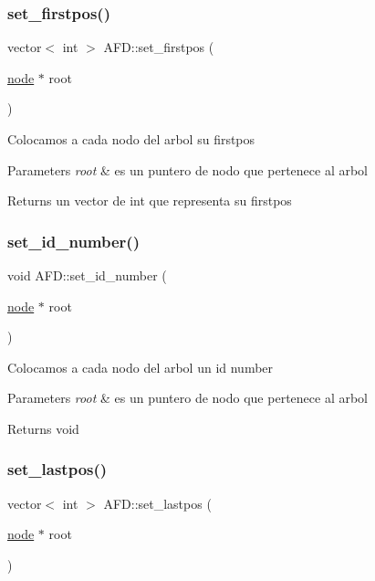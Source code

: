 \subsubsection{\texorpdfstring{set\+\_\+firstpos()}{set\_firstpos()}}
{\footnotesize\ttfamily vector$<$ int $>$ A\+F\+D\+::set\+\_\+firstpos (\begin{DoxyParamCaption}\item[{\hyperlink{structnode}{node} $\ast$}]{root }\end{DoxyParamCaption})}

Colocamos a cada nodo del arbol su firstpos 
\begin{DoxyParams}{Parameters}
{\em root} & es un puntero de nodo que pertenece al arbol \\
\hline
\end{DoxyParams}
\begin{DoxyReturn}{Returns}
un vector de int que representa su firstpos 
\end{DoxyReturn}
\hypertarget{class_a_f_d_a28ca2cf650830a32d1e1716f4a3c4e78}{}\label{class_a_f_d_a28ca2cf650830a32d1e1716f4a3c4e78} 
\subsubsection{\texorpdfstring{set\+\_\+id\+\_\+number()}{set\_id\_number()}}
{\footnotesize\ttfamily void A\+F\+D\+::set\+\_\+id\+\_\+number (\begin{DoxyParamCaption}\item[{\hyperlink{structnode}{node} $\ast$}]{root }\end{DoxyParamCaption})}

Colocamos a cada nodo del arbol un id number 
\begin{DoxyParams}{Parameters}
{\em root} & es un puntero de nodo que pertenece al arbol \\
\hline
\end{DoxyParams}
\begin{DoxyReturn}{Returns}
void 
\end{DoxyReturn}
\hypertarget{class_a_f_d_a6ebbbeb7971579ee7085730c52ee7dc5}{}\label{class_a_f_d_a6ebbbeb7971579ee7085730c52ee7dc5} 
\subsubsection{\texorpdfstring{set\+\_\+lastpos()}{set\_lastpos()}}
{\footnotesize\ttfamily vector$<$ int $>$ A\+F\+D\+::set\+\_\+lastpos (\begin{DoxyParamCaption}\item[{\hyperlink{structnode}{node} $\ast$}]{root }\end{DoxyParamCaption})}

